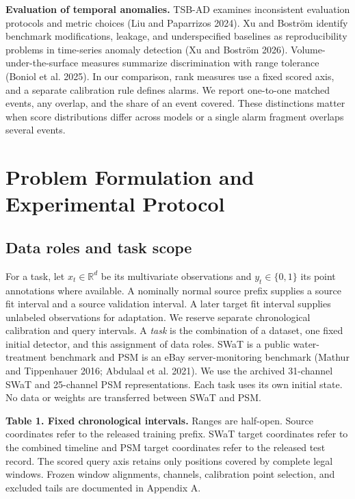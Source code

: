 \documentclass[
  american,
]{article}
\begin{document}
\textbf{Evaluation of temporal anomalies.} TSB-AD examines inconsistent
evaluation protocols and metric choices (Liu and Paparrizos 2024). Xu
and Boström identify benchmark modifications, leakage, and
underspecified baselines as reproducibility problems in time-series
anomaly detection (Xu and Boström 2026). Volume-under-the-surface
measures summarize discrimination with range tolerance (Boniol et al.
2025). In our comparison, rank measures use a fixed scored axis, and a
separate calibration rule defines alarms. We report one-to-one matched
events, any overlap, and the share of an event covered. These
distinctions matter when score distributions differ across models or a
single alarm fragment overlaps several events.

\section{Problem Formulation and Experimental
Protocol}\label{problem-formulation-and-experimental-protocol}

\subsection{Data roles and task scope}\label{data-roles-and-task-scope}

For a task, let \(x_t\in\mathbb{R}^d\) be its multivariate observations
and \(y_t\in\{0,1\}\) its point annotations where available. A nominally
normal source prefix supplies a source fit interval and a source
validation interval. A later target fit interval supplies unlabeled
observations for adaptation. We reserve separate chronological
calibration and query intervals. A \emph{task} is the combination of a
dataset, one fixed initial detector, and this assignment of data roles.
SWaT is a public water-treatment benchmark and PSM is an eBay
server-monitoring benchmark (Mathur and Tippenhauer 2016; Abdulaal et
al. 2021). We use the archived 31-channel SWaT and 25-channel PSM
representations. Each task uses its own initial state. No data or
weights are transferred between SWaT and PSM.

\textbf{Table 1. Fixed chronological intervals.} Ranges are half-open.
Source coordinates refer to the released training prefix. SWaT target
coordinates refer to the combined timeline and PSM target coordinates
refer to the released test record. The scored query axis retains only
positions covered by complete legal windows. Frozen window alignments,
channels, calibration point selection, and excluded tails are documented
in Appendix A.
\end{document}

